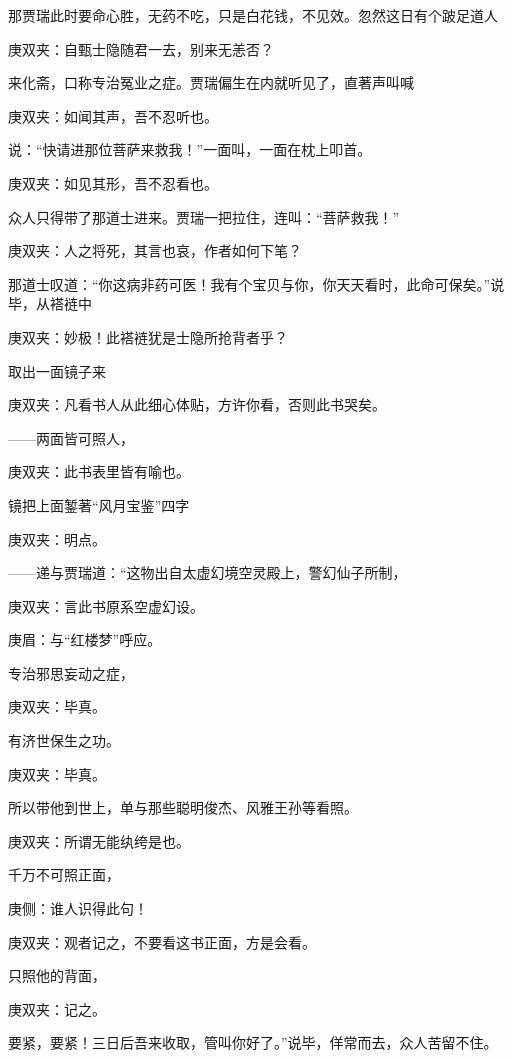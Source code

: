 \begin{parag}
    那贾瑞此时要命心胜，无药不吃，只是白花钱，不见效。忽然这日有个跛足道人\begin{note}庚双夹：自甄士隐随君一去，别来无恙否？\end{note}来化斋，口称专治冤业之症。贾瑞偏生在内就听见了，直著声叫喊\begin{note}庚双夹：如闻其声，吾不忍听也。\end{note}说：“快请进那位菩萨来救我！”一面叫，一面在枕上叩首。\begin{note}庚双夹：如见其形，吾不忍看也。\end{note}众人只得带了那道士进来。贾瑞一把拉住，连叫：“菩萨救我！”\begin{note}庚双夹：人之将死，其言也哀，作者如何下笔？\end{note}那道士叹道：“你这病非药可医！我有个宝贝与你，你天天看时，此命可保矣。”说毕，从褡裢中\begin{note}庚双夹：妙极！此褡裢犹是士隐所抢背者乎？\end{note}取出一面镜子来\begin{note}庚双夹：凡看书人从此细心体贴，方许你看，否则此书哭矣。\end{note}——两面皆可照人，\begin{note}庚双夹：此书表里皆有喻也。\end{note}镜把上面錾著“风月宝鉴”四字\begin{note}庚双夹：明点。\end{note}——递与贾瑞道：“这物出自太虚幻境空灵殿上，警幻仙子所制，\begin{note}庚双夹：言此书原系空虚幻设。\end{note}\begin{note}庚眉：与“红楼梦”呼应。\end{note}专治邪思妄动之症，\begin{note}庚双夹：毕真。\end{note}有济世保生之功。\begin{note}庚双夹：毕真。\end{note}所以带他到世上，单与那些聪明俊杰、风雅王孙等看照。\begin{note}庚双夹：所谓无能纨绔是也。\end{note}千万不可照正面，\begin{note}庚侧：谁人识得此句！\end{note}\begin{note}庚双夹：观者记之，不要看这书正面，方是会看。\end{note}只照他的背面，\begin{note}庚双夹：记之。\end{note}要紧，要紧！三日后吾来收取，管叫你好了。”说毕，佯常而去，众人苦留不住。
\end{parag}


